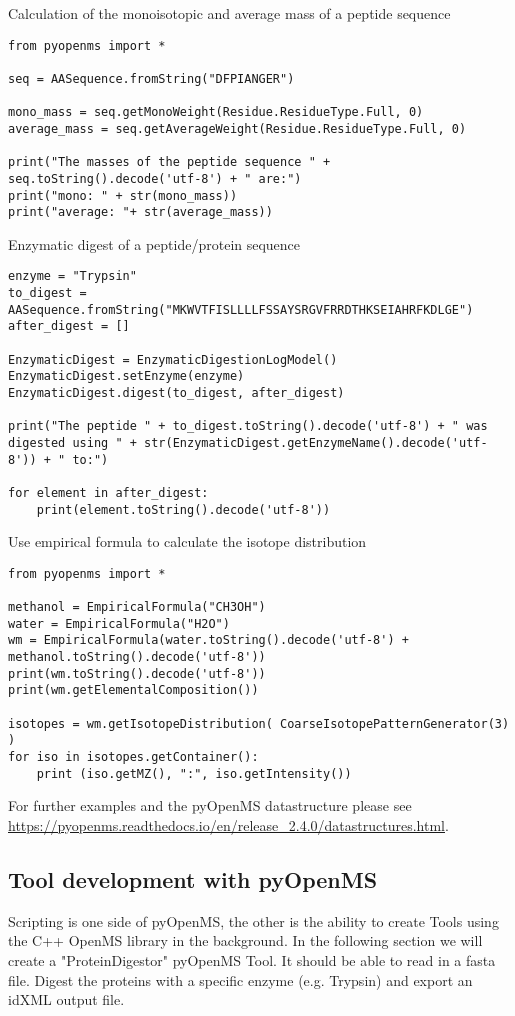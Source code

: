 {\noindent Calculation of the monoisotopic and average mass of a peptide sequence 
\begin{lstlisting}
from pyopenms import *

seq = AASequence.fromString("DFPIANGER")

mono_mass = seq.getMonoWeight(Residue.ResidueType.Full, 0)
average_mass = seq.getAverageWeight(Residue.ResidueType.Full, 0)

print("The masses of the peptide sequence " + seq.toString().decode('utf-8') + " are:")
print("mono: " + str(mono_mass))
print("average: "+ str(average_mass))
\end{lstlisting}

\noindent Enzymatic digest of a peptide/protein sequence 
\begin{lstlisting}
enzyme = "Trypsin"
to_digest = AASequence.fromString("MKWVTFISLLLLFSSAYSRGVFRRDTHKSEIAHRFKDLGE")
after_digest = []

EnzymaticDigest = EnzymaticDigestionLogModel()
EnzymaticDigest.setEnzyme(enzyme)
EnzymaticDigest.digest(to_digest, after_digest)

print("The peptide " + to_digest.toString().decode('utf-8') + " was digested using " + str(EnzymaticDigest.getEnzymeName().decode('utf-8')) + " to:")

for element in after_digest:
    print(element.toString().decode('utf-8'))
\end{lstlisting}

\noindent Use empirical formula to calculate the isotope distribution 
\begin{lstlisting}
from pyopenms import *

methanol = EmpiricalFormula("CH3OH")
water = EmpiricalFormula("H2O")
wm = EmpiricalFormula(water.toString().decode('utf-8') + methanol.toString().decode('utf-8'))
print(wm.toString().decode('utf-8'))
print(wm.getElementalComposition())

isotopes = wm.getIsotopeDistribution( CoarseIsotopePatternGenerator(3) )
for iso in isotopes.getContainer():
    print (iso.getMZ(), ":", iso.getIntensity())
\end{lstlisting}

\noindent For further examples and the pyOpenMS datastructure please see \url{https://pyopenms.readthedocs.io/en/release_2.4.0/datastructures.html}. 

\subsection{Tool development with pyOpenMS}
Scripting is one side of pyOpenMS, the other is the ability to create Tools using the C++ OpenMS library in the background.  In the following section we will create a "ProteinDigestor" pyOpenMS Tool. It should be able to read in a fasta file. Digest the proteins with a specific enzyme (e.g. Trypsin) and export an idXML output file.

}
